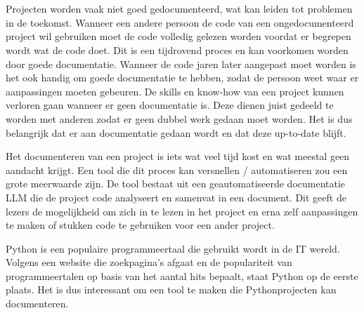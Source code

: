 
\chapter{}%
\label{ch:inleiding}


\section{}%
\label{sec:probleemstelling}

Projecten worden vaak niet goed gedocumenteerd, wat kan leiden tot problemen in de toekomst. Wanneer een andere persoon de code van een ongedocumenteerd project wil gebruiken moet de code volledig gelezen worden voordat er begrepen wordt wat de code doet. 
Dit is een tijdrovend proces en kan voorkomen worden door goede documentatie.
Wanneer de code jaren later aangepast moet worden is het ook handig om goede documentatie te hebben, zodat de persoon weet waar er aanpassingen moeten gebeuren.
De skills en know-how van een project kunnen verloren gaan wanneer er geen documentatie is.
Deze dienen juist gedeeld te worden met anderen zodat er geen dubbel werk gedaan moet worden.
Het is dus belangrijk dat er aan documentatie gedaan wordt en dat deze up-to-date blijft.

Het documenteren van een project is iets wat veel tijd kost en wat meestal geen aandacht krijgt.
Een tool die dit proces kan versnellen / automatiseren zou een grote meerwaarde zijn.
De tool bestaat uit een geautomatiseerde documentatie LLM die de project code analyseert en samenvat in een document. 
Dit geeft de lezers de mogelijkheid om zich in te lezen in het project en erna zelf aanpassingen te maken of stukken code te gebruiken voor een ander project.

Python is een populaire programmeertaal die gebruikt wordt in de IT wereld.
Volgens \textcite{TIOBE2024} een website die zoekpagina's afgaat en de populariteit van programmeertalen op basis van het aantal hits bepaalt, staat Python op de eerste plaats.
Het is dus interessant om een tool te maken die Pythonprojecten kan documenteren.

\section{}%
\label{sec:onderzoeksvraag}

